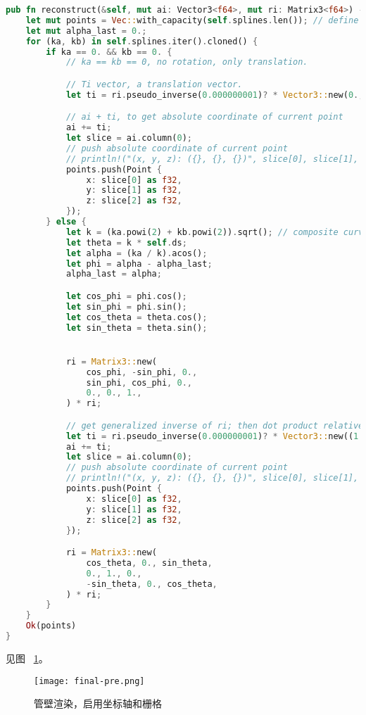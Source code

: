 \cleardoublepage
{}

\begin{lstlisting}[language=Rust, style=boxed]
pub fn reconstruct(&self, mut ai: Vector3<f64>, mut ri: Matrix3<f64>) -> Result<Vec<Point>, &'static str> {
    let mut points = Vec::with_capacity(self.splines.len()); // define points vector and reserve capacity
    let mut alpha_last = 0.;
    for (ka, kb) in self.splines.iter().cloned() {
        if ka == 0. && kb == 0. {
            // ka == kb == 0, no rotation, only translation.

            // Ti vector, a translation vector.
            let ti = ri.pseudo_inverse(0.000000001)? * Vector3::new(0., 0., self.ds);

            // ai + ti, to get absolute coordinate of current point
            ai += ti;
            let slice = ai.column(0);
            // push absolute coordinate of current point
            // println!("(x, y, z): ({}, {}, {})", slice[0], slice[1], slice[2]);
            points.push(Point {
                x: slice[0] as f32,
                y: slice[1] as f32,
                z: slice[2] as f32,
            });
        } else {
            let k = (ka.powi(2) + kb.powi(2)).sqrt(); // composite curvature
            let theta = k * self.ds;
            let alpha = (ka / k).acos();
            let phi = alpha - alpha_last;
            alpha_last = alpha;

            let cos_phi = phi.cos();
            let sin_phi = phi.sin();
            let cos_theta = theta.cos();
            let sin_theta = theta.sin();


            ri = Matrix3::new(
                cos_phi, -sin_phi, 0.,
                sin_phi, cos_phi, 0.,
                0., 0., 1.,
            ) * ri;

            // get generalized inverse of ri; then dot product relative coordinate
            let ti = ri.pseudo_inverse(0.000000001)? * Vector3::new((1. - cos_theta) / k, 0., sin_theta / k);
            ai += ti;
            let slice = ai.column(0);
            // push absolute coordinate of current point
            // println!("(x, y, z): ({}, {}, {})", slice[0], slice[1], slice[2]);
            points.push(Point {
                x: slice[0] as f32,
                y: slice[1] as f32,
                z: slice[2] as f32,
            });

            ri = Matrix3::new(
                cos_theta, 0., sin_theta,
                0., 1., 0.,
                -sin_theta, 0., cos_theta,
            ) * ri;
        }
    }
    Ok(points)
}
\end{lstlisting}


见图 ~\ref{fig:final-pre}。

\begin{figure}
\centering
\texttt{[image: final-pre.png]}
\caption{管壁渲染，启用坐标轴和栅格}
\label{fig:final-pre}
\end{figure}
